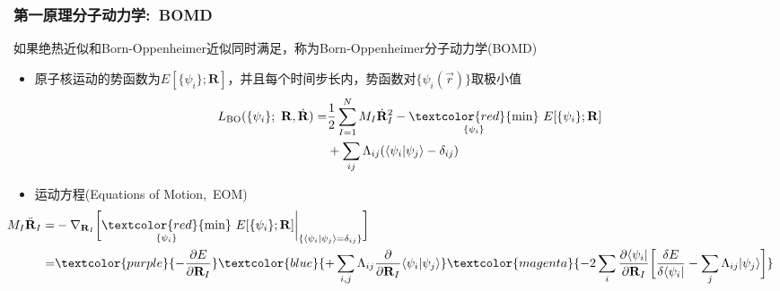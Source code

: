 {\frame
{
	\frametitle{第一原理分子动力学:~\textrm{BOMD}}
	如果绝热近似和\textrm{Born-Oppenheimer}近似同时满足，称为\textrm{Born-Oppenheimer}分子动力学\textrm{(BOMD)}
	\begin{itemize}
		\item 原子核运动的势函数为$E[\{\psi_i\};\mathbf{R}]$，并且每个时间步长内，势函数对$\{\psi_i(\vec r)\}$取极小值\\
			\begin{displaymath}
				\begin{aligned}
					L_{\mathrm{BO}}(\{\psi_i\};~\mathbf{R},\dot{\mathbf{R}})=&\dfrac12\sum_{I=1}^NM_I\dot{\mathbf{R}}^2_I-\underset{\{\psi_i\}}{\textcolor{red}{\min}}~E[\{\psi_i\};\mathbf{R}]\\
					&+\sum_{ij}\Lambda_{ij}(\langle\psi_i|\psi_j\rangle-\delta_{ij})
				\end{aligned}
			\end{displaymath}
		\item 运动方程\textrm{(Equations of Motion,~EOM)}
			\begin{displaymath}
				\begin{aligned}
					\hspace*{-40pt}
					M_I\ddot{\mathbf{R}}_I=&-\nabla_{\mathbf{R}_I}\bigg[\underset{\{\psi_i\}}{\textcolor{red}{\min}}~E[\{\psi_i\};\mathbf{R}]\bigg|_{\{\langle\psi_i|\psi_j\rangle=\delta_{ij}\}}\bigg]\\
					=&\textcolor{purple}{-\dfrac{\partial E}{\partial\mathbf{R}_I}}\textcolor{blue}{+\sum_{i,j}\Lambda_{ij}\dfrac{\partial}{\partial \mathbf{R}_I}\langle\psi_i|\psi_j\rangle}\textcolor{magenta}{-2\sum_i\dfrac{\partial\langle\psi_i|}{\partial\mathbf{R}_I}\bigg[\dfrac{\delta E}{\delta\langle\psi_i|}-\sum_j\Lambda_{ij}|\psi_j\rangle\bigg]}
				\end{aligned}
			\end{displaymath}
	\end{itemize}
}

}
